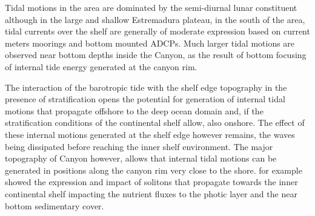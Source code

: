 Tidal motions in the area are dominated by the semi-diurnal lunar
constituent although in the large and shallow Estremadura plateau, in
the south of the area, tidal currents over the shelf are generally of
moderate expression  based on current meters
moorings and bottom mounted ADCPs.  Much larger tidal motions are
observed near bottom depths inside the \naz Canyon, as the result
of bottom focusing of internal tide energy generated at the canyon
rim. 
 
The interaction of the barotropic tide with the shelf edge topography
in the presence of stratification opens the potential for generation
of internal tidal motions that propagate offshore to the deep ocean
domain and, if the stratification conditions of the continental shelf
allow, also onshore. The effect of these internal motions generated at
the shelf edge however remains, the waves being dissipated before
reaching the inner shelf environment. The major topography of \naz
Canyon however, allows that internal tidal motions can be generated in
positions along the canyon rim very close to the
shore. \cite{quaresma07} %
for example showed the expression and impact of solitons that
propagate towards the inner continental shelf impacting the nutrient
fluxes to the photic layer and the near bottom sedimentary cover.

